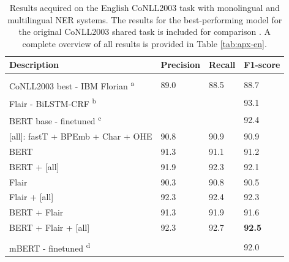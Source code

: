 \documentclass[12pt,a4paper,]{book}
\begin{document}
\begin{table}

\caption{\label{tab:conll2003-tab}Results acquired on the English CoNLL2003 task with monolingual and multilingual NER systems. The results for the best-performing model for the original CoNLL2003 shared task is included for comparison \citep{florian2003}. A complete overview of all results is provided in Table \ref{tab:apx-en}.}
\centering
\begin{tabular}[t]{llll}
\toprule
Description & Precision & Recall & F1-score\\
\midrule
\addlinespace[0.3em]
\multicolumn{4}{l}{\textbf{Monolingual}}\\
\textcolor[HTML]{999999}{\hspace{1em}CoNLL2003 best - IBM Florian \textsuperscript{a}} & \textcolor[HTML]{999999}{89.0} & \textcolor[HTML]{999999}{88.5} & \textcolor[HTML]{999999}{88.7}\\
\textcolor[HTML]{999999}{\hspace{1em}Flair - BiLSTM-CRF \textsuperscript{b}} & \textcolor[HTML]{999999}{} & \textcolor[HTML]{999999}{} & \textcolor[HTML]{999999}{93.1}\\
\textcolor[HTML]{999999}{\hspace{1em}BERT base - finetuned \textsuperscript{c}} & \textcolor[HTML]{999999}{} & \textcolor[HTML]{999999}{} & \textcolor[HTML]{999999}{92.4}\\
\hspace{1em}[all]: fastT + BPEmb + Char + OHE & 90.8 & 90.9 & 90.9\\
\hspace{1em}BERT & 91.3 & 91.1 & 91.2\\
\hspace{1em}BERT + [all] & 91.9 & 92.3 & 92.1\\
\hspace{1em}Flair & 90.3 & 90.8 & 90.5\\
\hspace{1em}Flair + [all] & 92.3 & 92.4 & 92.3\\
\hspace{1em}BERT + Flair & 91.3 & 91.9 & 91.6\\
\hspace{1em}BERT + Flair + [all] & 92.3 & 92.7 & \textbf{92.5}\\
\addlinespace[0.3em]
\multicolumn{4}{l}{\textbf{Multilingual}}\\
\textcolor[HTML]{999999}{\hspace{1em}mBERT - finetuned \textsuperscript{d}} & \textcolor[HTML]{999999}{} & \textcolor[HTML]{999999}{} & \textcolor[HTML]{999999}{92.0}\\

\end{tabular}
\end{table}
\end{document}
